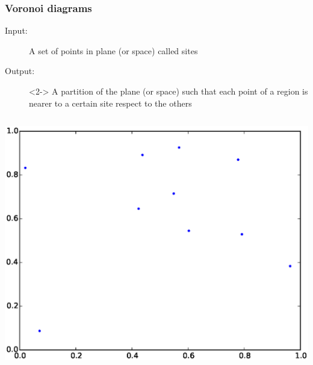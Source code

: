 \begin{frame}
  \frametitle{Voronoi diagrams}
  \begin{description}
  \item[Input:] A set of points in plane (or space) called
    \alert{sites}
  \item[Output:]<2-> A partition of the plane (or space) such that each
    point of a \alert{region} is nearer to a certain site respect to
    the others
  \end{description}
  \begin{columns}
    \begin{column}{0.5\textwidth}
      \begin{center}
        \includegraphics[width=\textwidth]{img/voroSites.eps}
      \end{center}
    \end{column}
  \end{columns}
\end{frame}

